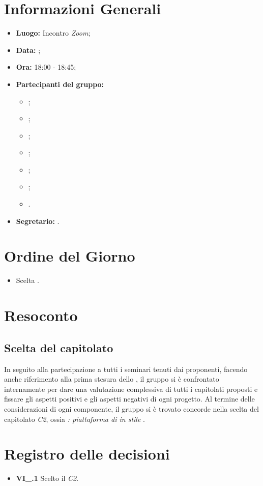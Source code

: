 \section{Informazioni Generali}
\begin{itemize}
\item \textbf{Luogo:} Incontro \textit{Zoom};
\item \textbf{Data:} \Data;
\item \textbf{Ora:} 18:00 - 18:45;
\item \textbf{Partecipanti del gruppo:}
	\begin{itemize}
		\item \BL{}; 
		\item \FF{};
		\item \MM{}; 
		\item \PC{};
		\item \TG{};
		\item \TL{};
		\item \VD{}.
	\end{itemize} 
\item \textbf{Segretario:} \PC{}.
\end{itemize}

\section{Ordine del Giorno}
\begin{itemize}
 \item Scelta .
\end{itemize}

\section{Resoconto}
\subsection{Scelta del capitolato}
In seguito alla partecipazione a tutti i seminari tenuti dai proponenti, facendo anche riferimento alla prima stesura dello \textit{\SdF}, il gruppo si è confrontato internamente per dare una valutazione complessiva di tutti i capitolati proposti e fissare gli aspetti positivi e gli aspetti negativi di ogni progetto.
Al termine delle considerazioni di ogni componente, il gruppo si è trovato concorde nella scelta del capitolato \textit{C2}, ossia \textit{\NomeProgetto: piattaforma di  in stile }.

\section{Registro delle decisioni}
\begin{itemize}
	\item \textbf{VI\_\Data.1} Scelto il  \textit{C2}.
\end{itemize}




